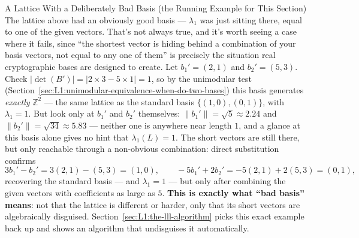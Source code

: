 \begin{exbox}{A Lattice With a Deliberately Bad Basis (the Running Example for This Section)}
The lattice above had an obviously good basis --- $\lambda_1$ was just sitting there, equal to one of the given vectors. That's not always true, and it's worth seeing a case where it fails, since ``the shortest vector is hiding behind a combination of your basis vectors, not equal to any one of them'' is precisely the situation real cryptographic bases are designed to create. Let $b_1' = (2,1)$ and $b_2' = (5,3)$. Check $|\det(B')| = |2\times 3 - 5\times 1| = 1$, so by the unimodular test (Section~\ref{sec:L1:unimodular-equivalence-when-do-two-bases}) this basis generates \emph{exactly} $\mathbb{Z}^2$ --- the same lattice as the standard basis $\{(1,0),(0,1)\}$, with $\lambda_1=1$. But look only at $b_1'$ and $b_2'$ themselves: $\|b_1'\|=\sqrt5\approx2.24$ and $\|b_2'\|=\sqrt{34}\approx5.83$ --- neither one is anywhere near length $1$, and a glance at this basis alone gives no hint that $\lambda_1(L)=1$. The short vectors are still there, but only reachable through a non-obvious combination: direct substitution confirms
$$
3b_1' - b_2' = 3(2,1)-(5,3) = (1,0), \qquad -5b_1'+2b_2' = -5(2,1)+2(5,3) = (0,1),
$$
recovering the standard basis --- and $\lambda_1=1$ --- but only after combining the given vectors with coefficients as large as $5$. \textbf{This is exactly what ``bad basis'' means}: not that the lattice is different or harder, only that its short vectors are algebraically disguised. Section~\ref{sec:L1:the-lll-algorithm} picks this exact example back up and shows an algorithm that undisguises it automatically.
\end{exbox}

